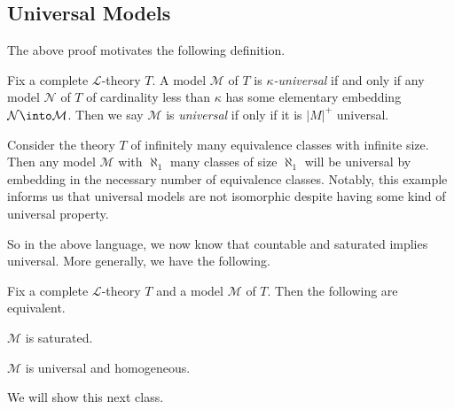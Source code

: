 \documentclass[../notes.tex]{subfiles}
\begin{document}
\subsection{Universal Models}
The above proof motivates the following definition.
\begin{defihelper} 
	Fix a complete $\mathcal L$-theory $T$. A model $\mathcal M$ of $T$ is \textit{$\kappa$-universal} if and only if any model $\mathcal N$ of $T$ of cardinality less than $\kappa$ has some elementary embedding $\mathcal N\into\mathcal M$. Then we say $\mathcal M$ is \textit{universal} if only if it is $\left|M\right|^+$ universal.
\end{defihelper}
\begin{example}
	Consider the theory $T$ of infinitely many equivalence classes with infinite size. Then any model $\mathcal M$ with $\aleph_1$ many classes of size $\aleph_1$ will be universal by embedding in the necessary number of equivalence classes. Notably, this example informs us that universal models are not isomorphic despite having some kind of universal property.
\end{example}
So in the above language, we now know that countable and saturated implies universal. More generally, we have the following.
\begin{theorem}
	Fix a complete $\mathcal L$-theory $T$ and a model $\mathcal M$ of $T$. Then the following are equivalent.
	\begin{listalph}
		\item $\mathcal M$ is saturated.
		\item $\mathcal M$ is universal and homogeneous.
	\end{listalph}
\end{theorem}
We will show this next class.
\end{document}
